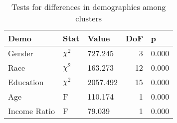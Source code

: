 \begin{table}[h]
\caption{Tests for differences in demographics among clusters}
\label{tab:cluster_demo_tests}
\begin{tabular}{lllrl}
\toprule
Demo & Stat & Value & DoF & p \\
\midrule
Gender & \(\chi^2\) & 727.245 & 3 & 0.000 \\
Race & \(\chi^2\) & 163.273 & 12 & 0.000 \\
Education & \(\chi^2\) & 2057.492 & 15 & 0.000 \\
Age & F & 110.174 & 1 & 0.000 \\
Income Ratio & F & 79.039 & 1 & 0.000 \\
\bottomrule
\end{tabular}
\end{table}
